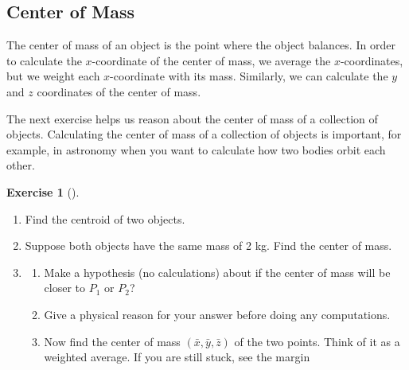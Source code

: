\documentclass[10pt,]{book}
\theoremstyle{plain}
\theoremstyle{definition}
\theoremstyle{definition}
\theoremstyle{definition}
\theoremstyle{definition}
\newtheorem{exploration}[project]{Exercise}
\theoremstyle{definition}
\numberwithin{equation}{section}
\begin{document}
\subsection[{Center of Mass}]{Center of Mass}\label{subsection-32}
The center of mass of an object is the point where the object balances. In order to calculate the \(x\)-coordinate of the center of mass, we average the \(x\)-coordinates, but we weight each \(x\)-coordinate with its mass. Similarly, we can calculate the \(y\) and \(z\) coordinates of the center of mass.%
\par
The next exercise helps us reason about the center of mass of a collection of objects. Calculating the center of mass of a collection of objects is important, for example, in astronomy when you want to calculate how two bodies orbit each other.%
\begin{exploration}[]\label{center_of_mass_with_two_points}
\leavevmode%
\begin{enumerate}[font=\bfseries,label=(\alph*),ref=\alph*]
\item\label{task-564} Find the centroid of two objects.%
\item\label{task-565} Suppose both objects have the same mass of 2 kg.  Find the center of mass.%
\item\label{task-566} \begin{enumerate}[font=\bfseries,label=(\roman*),ref=\theenumi.\roman*]
\item\label{task-567} Make a hypothesis (no calculations) about if the center of mass will be closer to \(P_1\) or \(P_2\)?%
\item\label{task-568} Give a physical reason for your answer before doing any computations.%
\item\label{task-569} Now find the center of mass \((\bar x, \bar y, \bar z)\) of the two points. Think of it as a weighted average. If you are still stuck, see the margin%
\end{enumerate}
\end{enumerate}
\end{exploration}
\end{document}
